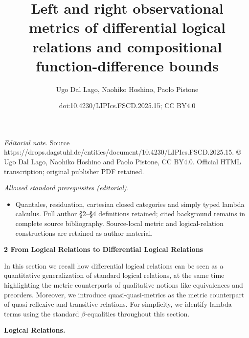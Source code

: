\documentclass[10pt,a4paper]{amsart}
\title{Left and right observational metrics of differential logical relations and compositional function-difference bounds}
\author{Ugo Dal Lago, Naohiko Hoshino, Paolo Pistone}
\date{doi:10.4230/LIPIcs.FSCD.2025.15; CC BY4.0}
\begin{document}
\maketitle
\noindent\textit{Editorial note.} Source https://drops.dagstuhl.de/entities/document/10.4230/LIPIcs.FSCD.2025.15. © Ugo Dal Lago, Naohiko Hoshino and Paolo Pistone, CC BY4.0. Official HTML transcription; original publisher PDF retained.\par\medskip
\noindent\textit{Allowed standard prerequisites (editorial).}\begin{itemize}
\item Quantales, residuation, cartesian closed categories and simply typed lambda calculus. Full author §2–§4 definitions retained; cited background remains in complete source bibliography. Source-local metric and logical-relation constructions are retained as author material.
\end{itemize}\medskip
 
\par\medskip\noindent\textbf{2 From Logical Relations to Differential Logical Relations}\par
 
 
In this section we recall how differential logical relations can be seen as a quantitative generalization of standard logical relations, at the same time highlighting the metric counterparts of qualitative notions like equivalences and preorders. Moreover, we introduce quasi-quasi-metrics as the metric counterpart of quasi-reflexive and transitive relations. For simplicity, we identify lambda terms using the standard $\beta$-equalities throughout this section.\par
 
 
 
\par\medskip\noindent\textbf{Logical Relations.}\par
 
 
\end{document}

